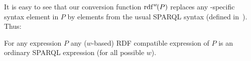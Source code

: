 \begin{enumerate}
%
\end{enumerate}


\noindent
It is easy to see that our conversion function $\mathrm{rdf}^{w}\!(P)$ replaces any \SPARQLplus-spe\-cif\-ic syntax element in $P$ by elements from the usual SPARQL syntax (defined in~\cite{Perez09:SemanticsAndComplexityOfSPARQL}). Thus:

\begin{proposition} \label{Proposition:EquivalenceOfSyntaxAfterConverting}
	For any {\SPARQLplus} expression $P$ any ($w$-based) RDF compatible expression of $P$ is an ordinary SPARQL expression (for all possible $w$).
\end{proposition}

